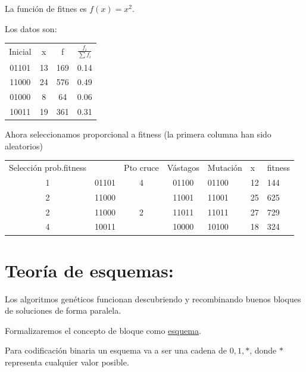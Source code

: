 \documentclass{apuntes}
\begin{document}
\begin{example}

La función de fitnes es $f(x) = x^2$.

Los datos son:

\begin{center}
\begin{tabular}{cccc}
Inicial & x & f & $\frac{f_i}{\sum f_i}$\\
01101&13&169&0.14\\
11000&24&576&0.49\\
01000&8&64&0.06\\
10011&19&361&0.31
\end{tabular}
\end{center}

Ahora seleccionamos proporcional a fitness (la primera columna han sido aleatorios)

\begin{center}
\begin{tabular}{cccc}
Selección prob.fitness && Pto cruce & Vástagos & Mutación & x & fitness\\
1 & 01101 & 4 & 01100 & 01100 & 12 & 144\\
2 & 11000 &   & 11001 & 11001 & 25 & 625\\
2 & 11000 & 2 & 11011 & 11011 & 27 & 729\\
4 & 10011 &   & 10000 & 10100 & 18 & 324
\end{tabular}
\end{center}

\end{example}

\section{Teoría de esquemas:}

Los algoritmos genéticos funcionan descubriendo y recombinando buenos bloques de soluciones de forma paralela.

Formalizaremos el concepto de bloque como \underline{esquema}.

Para codificación binaria un esquema va a ser una cadena de $0,1,*$, donde $*$ representa cualquier valor posible.
\end{document}

